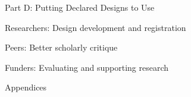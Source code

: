 \documentclass[11pt]{article}
\begin{document}
\begin{legal}
\item Part D: Putting Declared Designs to Use

	\begin{legal}
	\item  Researchers: Design development and registration
	\item  Peers: Better scholarly critique
	\item  Funders: Evaluating and supporting research 
	\end{legal}


\item Appendices
\end{legal}

\newpage



\end{document}

